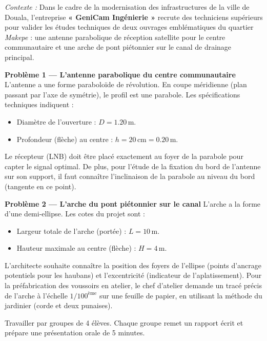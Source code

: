 \documentclass[11pt]{article}
\newcounter{popsec}
\newcounter{popsub}
\newcommand{\courssub}[1]{%
  \stepcounter{popsub}%
  \par\vspace{9pt}\noindent{\popxbold\fontsize{11.5}{13}\selectfont\color{popink}{\color{poporange}\thepopsec.\thepopsub}\hspace{6pt}#1}\par\nopagebreak\vspace{4pt}
}
\begin{document}
\courssub{Situation}
\emph{Contexte :} Dans le cadre de la modernisation des infrastructures de la ville de Douala, l'entreprise \textbf{« GeniCam Ingénierie »} recrute des techniciens supérieurs pour valider les études techniques de deux ouvrages emblématiques du quartier \emph{Makepe} : une antenne parabolique de réception satellite pour le centre communautaire et une arche de pont piétonnier sur le canal de drainage principal.

\medskip
\noindent \textbf{Problème 1 — L'antenne parabolique du centre communautaire}
L'antenne a une forme paraboloïde de révolution. En coupe méridienne (plan passant par l'axe de symétrie), le profil est une parabole. Les spécifications techniques indiquent :
\begin{itemize}
    \item Diamètre de l'ouverture : $D = \num{1,20}\,\text{m}$.
    \item Profondeur (flèche) au centre : $h = \num{20}\,\text{cm} = \num{0,20}\,\text{m}$.
\end{itemize}
Le récepteur (LNB) doit être placé exactement au foyer de la parabole pour capter le signal optimal. De plus, pour l'étude de la fixation du bord de l'antenne sur son support, il faut connaître l'inclinaison de la parabole au niveau du bord (tangente en ce point).

\medskip
\noindent \textbf{Problème 2 — L'arche du pont piétonnier sur le canal}
L'arche a la forme d'une demi-ellipse. Les cotes du projet sont :
\begin{itemize}
    \item Largeur totale de l'arche (portée) : $L = \num{10}\,\text{m}$.
    \item Hauteur maximale au centre (flèche) : $H = \num{4}\,\text{m}$.
\end{itemize}
L'architecte souhaite connaître la position des foyers de l'ellipse (points d'ancrage potentiels pour les haubans) et l'excentricité (indicateur de l'aplatissement). Pour la préfabrication des voussoirs en atelier, le chef d'atelier demande un tracé précis de l'arche à l'échelle $1/100^{\text{ème}}$ sur une feuille de papier, en utilisant la méthode du jardinier (corde et deux punaises).

\courssub{Consignes}
Travailler par groupes de 4 élèves. Chaque groupe remet un rapport écrit et prépare une présentation orale de 5 minutes.
\end{document}
